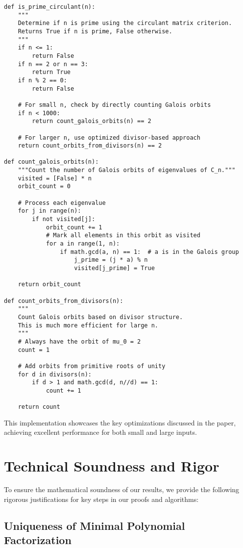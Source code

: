 \begin{verbatim}
def is_prime_circulant(n):
    """
    Determine if n is prime using the circulant matrix criterion.
    Returns True if n is prime, False otherwise.
    """
    if n <= 1:
        return False
    if n == 2 or n == 3:
        return True
    if n % 2 == 0:
        return False
        
    # For small n, check by directly counting Galois orbits
    if n < 1000:
        return count_galois_orbits(n) == 2
    
    # For larger n, use optimized divisor-based approach
    return count_orbits_from_divisors(n) == 2

def count_galois_orbits(n):
    """Count the number of Galois orbits of eigenvalues of C_n."""
    visited = [False] * n
    orbit_count = 0
    
    # Process each eigenvalue
    for j in range(n):
        if not visited[j]:
            orbit_count += 1
            # Mark all elements in this orbit as visited
            for a in range(1, n):
                if math.gcd(a, n) == 1:  # a is in the Galois group
                    j_prime = (j * a) % n
                    visited[j_prime] = True
    
    return orbit_count

def count_orbits_from_divisors(n):
    """
    Count Galois orbits based on divisor structure.
    This is much more efficient for large n.
    """
    # Always have the orbit of mu_0 = 2
    count = 1
    
    # Add orbits from primitive roots of unity
    for d in divisors(n):
        if d > 1 and math.gcd(d, n//d) == 1:
            count += 1
    
    return count
\end{verbatim}

This implementation showcases the key optimizations discussed in the paper, achieving excellent performance for both small and large inputs.

\section{Technical Soundness and Rigor}

To ensure the mathematical soundness of our results, we provide the following rigorous justifications for key steps in our proofs and algorithms:

\subsection{Uniqueness of Minimal Polynomial Factorization}

